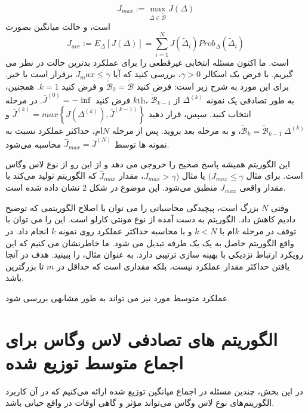 \documentclass[12pt]{article} %
\begin{document}
	\begin{equation}
		J_{max} := \max_{\Delta \in \tilde{\mathscr{B}}}J(\Delta)
	\end{equation}
	است، و حالت میانگین بصورت
	\begin{equation*}
		J_{ave} := E_\Delta\left[J(\Delta)\right] = \sum_{i=1}^N J(\tilde{\Delta}_i)Prob_\Delta(\tilde{\Delta}_i)
	\end{equation*}
	است.
	ما اکنون مسئله انتخابی غیرقطعی را برای عملکرد بدترین حالت در نظر می گیریم. با فرض یک اسکالر $\gamma > 0$، بررسی کنید که آیا 
	$J_max \leq \gamma$
	برقرار است یا خیر.
	 برای این مورد به شرح زیر است: فرض کنید $\tilde{\mathscr{B}}_0 = \tilde{\mathscr{B}}$ و فرض کنید $k = 1$. همچنین، فرض کنید $\bar{J}^{(0)} = -\inf$. در مرحله $k$th، به طور تصادفی یک نمونه $\Delta^{(k)}$ از $\tilde{\mathscr{B}}_{k-1}$ انتخاب کنید. سپس، قرار دهید 
	$\bar{J}^{(k)} = max \left\{J(\Delta^{(k)}), \bar{J}^{(k-1)}\right\}$
	 و $\tilde{\mathscr{B}}_k = \tilde{\mathscr{B}}_{k-1} \ {\Delta^{(k)}}$، و به مرحله بعد بروید. پس از مرحله $N$ام، حداکثر عملکرد نسبت به نمونه ها توسط $\hat{J}_{max} = \bar{J}^{(N)}$ محاسبه می‌شود.
	\par
	این الگوریتم همیشه پاسخ صحیح را خروجی می دهد و از این رو از نوع لاس وگاس است. برای مثال $(J_{max} \leq \gamma$ یا مثال $J_{max} > \gamma)$، مقدار \textbf{$\hat{J}_{max}$} که الگوریتم تولید می‌کند با مقدار واقعی $J_{max}$ منطبق می‌شود. این موضوع در شکل 2 نشان داده شده است.
	\par
	وقتی $N$ بزرگ است، پیچیدگی محاسباتی را می توان با اصلاح الگوریتمی که توضیح دادیم کاهش داد. الگوریتم به دست آمده از نوع مونتی کارلو است. این را می توان با توقف در مرحله $k$ام با $k <N$ و با محاسبه حداکثر عملکرد روی نمونه $k$ انجام داد. در واقع الگوریتم حاصل به یک  یک طرفه تبدیل می شود. ما خاطرنشان می کنیم که این رویکرد ارتباط نزدیکی با بهینه سازی ترتیبی دارد. به عنوان مثال، \cite{bib08} را ببینید. هدف در آنجا یافتن حداکثر مقدار عملکرد نیست، بلکه مقداری است که حداقل در $m$ تا بزرگترین باشد.
	\par
	عملکرد متوسط مورد نیز می تواند به طور مشابهی بررسی شود.			
	
	\section{الگوریتم های تصادفی لاس وگاس برای اجماع متوسط توزیع شده}
	در این بخش، چندین مسئله در اجماع میانگین توزیع شده ارائه می‌کنیم که در آن کاربرد الگوریتم‌های نوع لاس وگاس می‌تواند مؤثر و گاهی اوقات در واقع حیاتی باشد.
	
\end{document}
